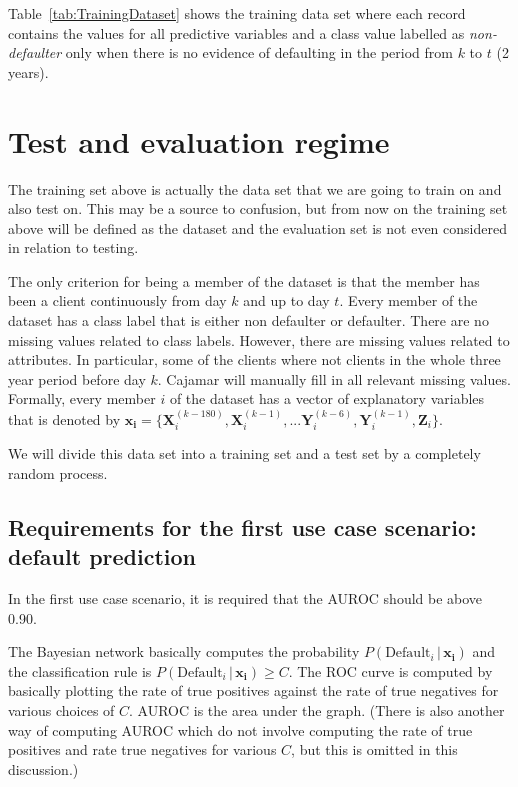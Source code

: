\documentclass{article}
\theoremstyle{theorem}
\theoremstyle{definition}
\newcommand{\bv}[1]{\bm{#1}}
\newcommand{\X}{\mathbf{X}}
\newcommand{\Y}{\mathbf{Y}}
\newcommand{\Z}{\mathbf{Z}}
\begin{document}
{\begin{itemize}
Table~\ref{tab:TrainingDataset} shows the training data set where each record contains the values for all predictive variables and a class value labelled as \emph{non-defaulter} only when there is no evidence of defaulting in the period from $k$ to $t$ (2 years). 

\end{itemize}

\section{Test and evaluation regime}

The training set above is actually the data set that we are going to train on and also test on. This may be a source to confusion, but from now on the training set above will be defined as the dataset and the evaluation set is not even considered in relation to testing. 

The only criterion for being a member of the dataset is that the member has been a client continuously from day $k$ and up to day $t$.  Every member of the dataset has a class label that is either non defaulter or defaulter.  There are no missing values related to class labels.  However, there are missing values related to attributes.  In particular, some of the clients where not clients in the whole three year period before day $k$.  Cajamar will manually fill in all relevant missing values.  Formally, every member $i$ of the dataset has a vector of explanatory variables that is denoted by $\bv{x_i} =\{ \X_i^{(k-180)},  \X_i^{(k-1)}, ...\Y_i^{(k-6)}, \Y_i^{(k-1)},\Z_i\}$.  

We will divide this data set into a training set and a test set by a completely random process.

\subsection{Requirements for the first use case scenario: default prediction}

In the first use case scenario, it is required that the AUROC should be above 0.90.
 
The Bayesian network basically computes the probability $P(\mbox{Default}_i \,|\, \bv{x_i})$ and the classification rule is
$P(\mbox{Default}_i \,|\, \bv{x_i}) \geq C$.  The ROC curve is computed by basically plotting the rate of true positives against the rate of true negatives for various choices of $C$.  AUROC is the area under the graph.  (There is also another way of computing AUROC which do not involve computing the rate of true positives and rate true negatives for various $C$, but this is omitted in this discussion.)

}
\end{document}
